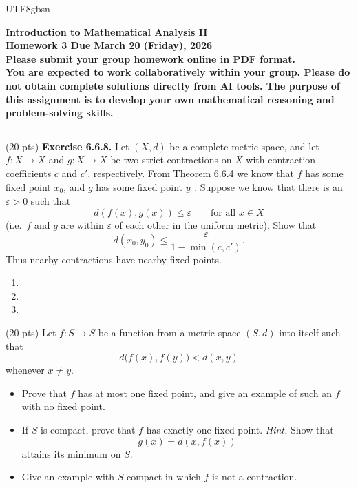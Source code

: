 \documentclass[addpoints]{exam}
\theoremstyle{definition}
\begin{document}
\begin{CJK*}{UTF8}{gbsn}
\begin{center}
    {\Large{\bf Introduction to Mathematical Analysis II\\
    Homework 3  Due  March 20  (Friday), 2026\\
    Please submit your group homework online in PDF format.\\
You are expected to work collaboratively within your group. 
Please do not obtain complete solutions directly from AI tools. 
The purpose of this assignment is to develop your own mathematical reasoning and problem-solving skills. %
  }} \\ 
    \large
\end{center}

\noindent\rule{16.2cm}{0.4pt}


\begin{questions}


\question  (20 pts)  
\textbf{Exercise 6.6.8.}
Let $(X,d)$ be a complete metric space, and let $f:X\to X$ and $g:X\to X$ be two strict
contractions on $X$ with contraction coefficients $c$ and $c'$, respectively.
From Theorem 6.6.4 we know that $f$ has some fixed point $x_0$, and $g$ has some fixed point
$y_0$. Suppose we know that there is an $\varepsilon>0$ such that
$$
d(f(x),g(x))\le \varepsilon
\qquad \text{for all } x\in X
$$
(i.e.\ $f$ and $g$ are within $\varepsilon$ of each other in the uniform metric).
Show that
$$
d(x_0,y_0)\le \frac{\varepsilon}{1-\min(c,c')}.
$$
Thus nearby contractions have nearby fixed points.

\begin{solution} 
\begin{enumerate}
\item[(a)] 



\bigskip
\item[(b)] 


\bigskip
\item[(c)] 

\end{enumerate}

 \end{solution}

\question (20 pts) 
Let \(f:S\to S\) be a function from a metric space \((S,d)\) into itself such that
\[
d\bigl(f(x),f(y)\bigr)<d(x,y)
\]
whenever \(x\ne y\).

\begin{itemize}
\item[(a)] Prove that \(f\) has at most one fixed point, and give an example of such an \(f\) with no fixed point.
\item[(b)] If \(S\) is compact, prove that \(f\) has exactly one fixed point. \emph{Hint.} Show that
\[
g(x)=d(x,f(x))
\]
attains its minimum on \(S\).
\item[(c)] Give an example with \(S\) compact in which \(f\) is not a contraction.
\end{itemize}



\end{questions}
\end{CJK*}
\end{document}
